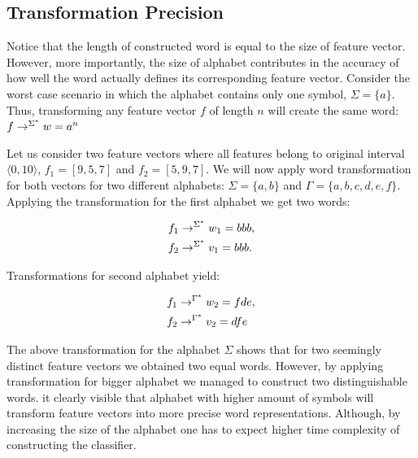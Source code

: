 \documentclass{mini}
\begin{document}
\subsection{Transformation Precision}\label{sec:lan_theory_transf_prec}

Notice that the length of constructed word is equal to the size of feature vector. However, more importantly, the size of alphabet contributes in the accuracy of how well the word actually defines its corresponding feature vector. Consider the worst case scenario in which the alphabet contains only one symbol, $\Sigma=\{a\}$. Thus, transforming any feature vector $f$ of length $n$ will create the same word: $f \rightarrow^{\Sigma^{*}} w = a^{n}$


\begin{example} \label{ex:transf_prec}
    Let us consider two feature vectors where all features belong to original interval $\langle 0, 10 \rangle$, $f_1=[9, 5, 7]$ and $f_2=[5,9,7]$. We will now apply word transformation for both vectors for two different alphabets: $\Sigma=\{a,b\}$ and $\Gamma=\{a,b,c,d,e,f\}$. Applying the transformation for the first alphabet we get two words: 
    
    \begin{center}
        \begin{align*}
        &f_1 \rightarrow^{\Sigma^{*}} w_1 = bbb, \\ &f_2 \rightarrow^{\Sigma^{*}} v_1 = bbb.
        \end{align*}
    \end{center}
    
    Transformations for second alphabet yield: 
    
    \begin{center}
        \begin{align*}
        &f_1 \rightarrow^{\Gamma^{*}} w_2 = fde, \\ &f_2 \rightarrow^{\Gamma^{*}} v_2 = dfe
        \end{align*}
    \end{center}
\end{example}

The above transformation for the alphabet $\Sigma$ shows that for two seemingly distinct feature vectors we obtained two equal words. However, by applying transformation for bigger alphabet we managed to construct two distinguishable words.
it clearly visible that alphabet with higher amount of symbols will transform feature vectors into more precise word representations. Although, by increasing the size of the alphabet one has to expect higher time complexity of constructing the classifier.
\end{document}
